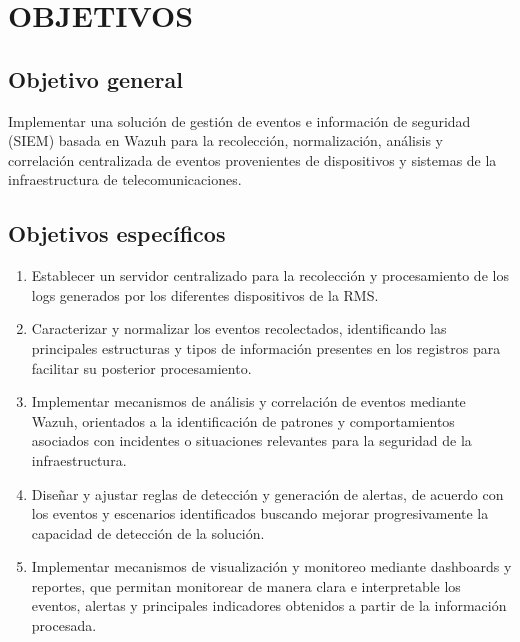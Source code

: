 \chapter{OBJETIVOS}

\section{Objetivo general}
Implementar una solución de gestión de eventos e información de seguridad (SIEM) basada en Wazuh para la recolección, normalización, análisis y correlación centralizada de eventos provenientes de dispositivos y sistemas de la infraestructura de telecomunicaciones.

\section{Objetivos específicos}
\begin{enumerate}
    \item Establecer un servidor centralizado para la recolección y procesamiento de los logs generados por los diferentes dispositivos de la RMS.
    \item Caracterizar y normalizar los eventos recolectados, identificando las principales estructuras y tipos de información presentes en los registros para facilitar su posterior procesamiento.
    \item Implementar mecanismos de análisis y correlación de eventos mediante Wazuh, orientados a la identificación de patrones y comportamientos asociados con incidentes o situaciones relevantes para la seguridad de la infraestructura.
    \item Diseñar y ajustar reglas de detección y generación de alertas, de acuerdo con los eventos y escenarios identificados buscando mejorar progresivamente la capacidad de detección de la solución.
    \item Implementar mecanismos de visualización y monitoreo mediante dashboards y reportes, que permitan monitorear de manera clara e interpretable los eventos, alertas y principales indicadores obtenidos a partir de la información procesada.
\end{enumerate}